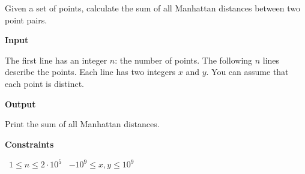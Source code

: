 Given a set of points, calculate the sum of all Manhattan distances between two point pairs.

\vspace{0.3cm}\noindent\textbf{Input}

The first line has an integer $n$: the number of points.
The following $n$ lines describe the points. Each line has two integers $x$ and $y$. You can assume that each point is distinct.

\vspace{0.3cm}\noindent\textbf{Output}

Print the sum of all Manhattan distances.

\vspace{0.3cm}\noindent\textbf{Constraints}

\textbullet\ $1 \le n \le 2 \cdot 10^5$
\textbullet\ $-10^9 \le x, y \le 10^9$